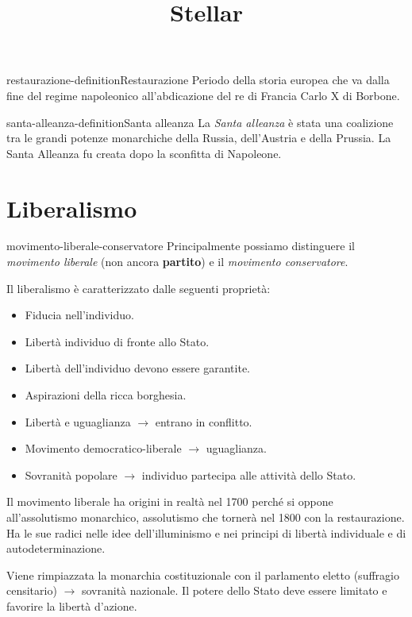 \documentclass[preview]{standalone}
\begin{document}
\title{Stellar}
\genpage

\begin{snippetdefinition}{restaurazione-definition}{Restaurazione}
    Periodo della storia europea che va dalla fine del regime napoleonico
    all'abdicazione del re di Francia Carlo X di Borbone.
\end{snippetdefinition}

\begin{snippetdefinition}{santa-alleanza-definition}{Santa alleanza}
    La \textit{Santa alleanza} è stata una coalizione tra le grandi potenze monarchiche della Russia, dell'Austria e della Prussia.
    La Santa Alleanza fu creata dopo la sconfitta di Napoleone.
\end{snippetdefinition}

\section{Liberalismo}

\begin{snippet}{movimento-liberale-conservatore}
    Principalmente possiamo distinguere il \textit{movimento liberale} (non ancora \textbf{partito})
    e il \textit{movimento conservatore}.

    Il liberalismo è caratterizzato dalle seguenti proprietà:
    \begin{itemize}
        \item Fiducia nell'individuo.
        \item Libertà individuo di fronte allo Stato.
        \item Libertà dell'individuo devono essere garantite.
        \item Aspirazioni della ricca borghesia.
        \item Libertà e uguaglianza \(\rightarrow\) entrano in conflitto.
        \item Movimento democratico-liberale \(\rightarrow\) uguaglianza.
        \item Sovranità popolare \(\rightarrow\) individuo partecipa alle attività dello Stato.
    \end{itemize}

    Il movimento liberale ha origini in realtà nel 1700 perché si oppone
    all'assolutismo monarchico, assolutismo che tornerà nel 1800 con la restaurazione.
    Ha le sue radici nelle idee dell'illuminismo e nei principi di libertà individuale e di autodeterminazione.

    Viene rimpiazzata la monarchia costituzionale con il parlamento eletto (suffragio censitario)
    \(\rightarrow\) sovranità nazionale.
    Il potere dello Stato deve essere limitato e favorire la libertà d'azione.
\end{snippet}
\end{document}
